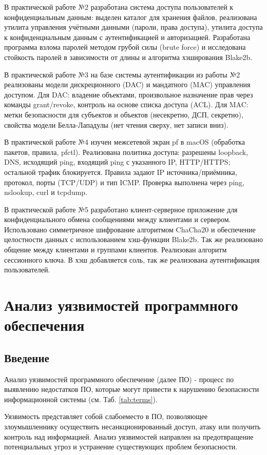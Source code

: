 \documentclass[areasetadvanced]{scrartcl}
\begin{document}
В практической работе №2 разработана система доступа пользователей к конфиденциальным данным: выделен каталог для хранения файлов, реализована утилита управления учётными данными (пароли, права доступа), утилита доступа к конфиденциальным данным с аутентификацией и авторизацией. Разработана программа взлома паролей методом грубой силы (brute force) и исследована стойкость паролей в зависимости от длины и алгоритма хэширования Blake2b.

В практической работе №3 на базе системы аутентификации из работы №2 реализованы модели дискреционного (DAC) и мандатного (MAC) управления доступом. Для DAC: владение объектами, произвольное назначение прав через команды grant/revoke, контроль на основе списка доступа (ACL). Для MAC: метки безопасности для субъектов и объектов (несекретно, ДСП, секретно), свойства модели Белла-Лападулы (\guillemetleft нет чтения сверху\guillemetright, \guillemetleft нет записи вниз\guillemetright).

В практической работе №4 изучен межсетевой экран pf в macOS (обработка пакетов, правила, pfctl). Реализована политика доступа: разрешены loopback, DNS, исходящий ping, входящий ping с указанного IP, HTTP/HTTPS; остальной трафик блокируется. Правила задают IP источника/приёмника, протокол, порты (TCP/UDP) и тип ICMP. Проверка выполнена через ping, nslookup, curl и tcpdump.

В практической работе №5 разработано клиент-серверное приложение для конфиденциального обмена сообщениями между клиентами и сервером. Использовано симметричное шифрование алгоритмом ChaCha20 и обеспечение целостности данных с использованием хэш-функции Blake2b. Так же реализовано общение между клиентами и группами клиентов. Реализован алгоритм сессионного ключа. В хэш добавляется соль, так же реализована аутентификация пользователей.
\newpage
\section{Анализ уязвимостей программного обеспечения}
\subsection{Введение}

Анализ уязвимостей программного обеспечение (далее ПО) - процесс по выявлению недостатков ПО, которые могут
привести к нарушению безопасности информационной системы (см. Таб. \ref{tab:terms}).

Уязвимость представляет собой \guillemetleft  слабое\guillemetright место в ПО, позволяющее злоумышленнику осуществить несанкционированный доступ, атаку или получить контроль над информацией.
Анализ уязвимостей направлен на предотвращение потенциальных угроз и устранение существующих проблем безопасности.
\end{document}
